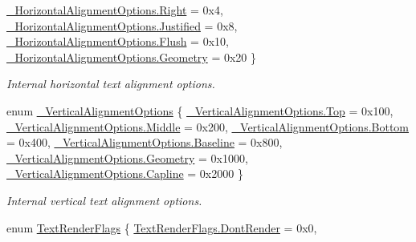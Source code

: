 \begin{DoxyCompactItemize}
\mbox{\hyperlink{namespace_t_m_pro_a79f7a2a68b3f84bfa58703520cbf4398a92b09c7c48c520c3c55e497875da437c}{\+\_\+\+Horizontal\+Alignment\+Options.\+Right}} = 0x4, 
\mbox{\hyperlink{namespace_t_m_pro_a79f7a2a68b3f84bfa58703520cbf4398a058cc077563d4b47b43ae642a6478159}{\+\_\+\+Horizontal\+Alignment\+Options.\+Justified}} = 0x8, 
\newline
\mbox{\hyperlink{namespace_t_m_pro_a79f7a2a68b3f84bfa58703520cbf4398a75f33789f924a80667bcdf8e195c1a1d}{\+\_\+\+Horizontal\+Alignment\+Options.\+Flush}} = 0x10, 
\mbox{\hyperlink{namespace_t_m_pro_a79f7a2a68b3f84bfa58703520cbf4398ad9c6333623e6357515fcbf17be806273}{\+\_\+\+Horizontal\+Alignment\+Options.\+Geometry}} = 0x20
 \}
\begin{DoxyCompactList}\small\item\em Internal horizontal text alignment options. \end{DoxyCompactList}\item 
enum \mbox{\hyperlink{namespace_t_m_pro_a07b15f9663ec46da089aeb784eccf193}{\+\_\+\+Vertical\+Alignment\+Options}} \{ \newline
\mbox{\hyperlink{namespace_t_m_pro_a07b15f9663ec46da089aeb784eccf193aa4ffdcf0dc1f31b9acaf295d75b51d00}{\+\_\+\+Vertical\+Alignment\+Options.\+Top}} = 0x100, 
\mbox{\hyperlink{namespace_t_m_pro_a07b15f9663ec46da089aeb784eccf193ab1ca34f82e83c52b010f86955f264e05}{\+\_\+\+Vertical\+Alignment\+Options.\+Middle}} = 0x200, 
\mbox{\hyperlink{namespace_t_m_pro_a07b15f9663ec46da089aeb784eccf193a2ad9d63b69c4a10a5cc9cad923133bc4}{\+\_\+\+Vertical\+Alignment\+Options.\+Bottom}} = 0x400, 
\mbox{\hyperlink{namespace_t_m_pro_a07b15f9663ec46da089aeb784eccf193aa4a32c4764653e50488bff6ce2eb815b}{\+\_\+\+Vertical\+Alignment\+Options.\+Baseline}} = 0x800, 
\newline
\mbox{\hyperlink{namespace_t_m_pro_a07b15f9663ec46da089aeb784eccf193ad9c6333623e6357515fcbf17be806273}{\+\_\+\+Vertical\+Alignment\+Options.\+Geometry}} = 0x1000, 
\mbox{\hyperlink{namespace_t_m_pro_a07b15f9663ec46da089aeb784eccf193ae5832b289b6f80984a1eda63ea8398d7}{\+\_\+\+Vertical\+Alignment\+Options.\+Capline}} = 0x2000
 \}
\begin{DoxyCompactList}\small\item\em Internal vertical text alignment options. \end{DoxyCompactList}\item 
enum \mbox{\hyperlink{namespace_t_m_pro_ac5a571bdd8e4873a73f2c05b62feff0e}{Text\+Render\+Flags}} \{ \mbox{\hyperlink{namespace_t_m_pro_ac5a571bdd8e4873a73f2c05b62feff0ea8d8877558d80d9020a901ed9768c89ec}{Text\+Render\+Flags.\+Dont\+Render}} = 0x0, 

\end{DoxyCompactItemize}
